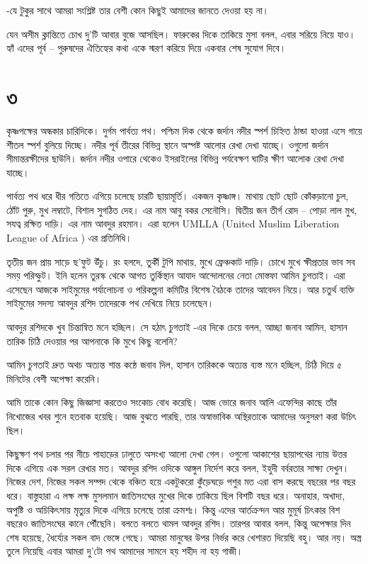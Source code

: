 \documentclass[
]{book}
\begin{document}
-যে টুকুর সাথে আমরা সংশ্লিষ্ট তার বেশী কোন কিছুই আমাদের জানতে দেওয়া হয় না।

যেন অসীম ক্লান্তিতে চোখ দু'টি আবার বুজে আসছিল। ফারুকের দিকে তাকিয়ে মুসা বলল, এবার সরিয়ে নিয়ে যাও। হ্যাঁ এদের পূর্ব -- পুরুষদের ঐতিহ্যের কথা একে স্মরণ করিয়ে দিয়ে একবার শেষ সুযোগ দিবে।

\section*{৩}\label{ota-1-3}

কৃষ্ণপক্ষের অন্ধকার চারিদিকে। দুর্গম পার্বত্য পথ। পশ্চিম দিক থেকে জর্দান নদীর স্পর্শ চিহ্নিত ঠান্ডা হাওয়া এসে গায়ে শীতল স্পর্শ বুলিয়ে দিচ্ছে। নদীর পূর্ব তীরের বিভিন্ন স্থানে অস্পষ্ট আলোর রেখা দেখা যাচ্ছে্। ওগুলো জর্দান সীমান্তরক্ষীদের ছাউনি। জর্দান নদীর ওপারে থেকেও ইসরাইলের বিভিন্ন পর্যবেক্ষণ ঘাটির ক্ষীণ আলোক রেখা দেখা যাচ্ছে।

পার্বত্য পথ ধরে ধীর গতিতে এগিয়ে চলেছে চারটি ছায়ামূর্তি। একজন কৃষ্ণাঙ্গ। মাথায় ছোট ছোট কোঁকড়ানো চুল, ঠোঁট পুরু, মুখ লম্বাটে, বিশাল সুগঠিত দেহ। এর নাম আবু বকর সেনৌসি। দ্বিতীয় জন তীর্গ রোদ -- পোড়া লাল মুখ, সযত্ব রক্ষিত দাড়ি। এর নাম আবদুর রহমান। এরা হলেন UMLLA (United Muslim Liberation League of Africa ) এর প্রতিনিধি।

তৃতীয় জন প্রায় সাড়ে ছ'ফুট উঁচু। রং হলদে, তুর্কী টুপি মাথায়, মুখে ফ্রেঞ্চকাট দাড়ি। চোখে মুখে ক্ষীপ্রতার ভাব সব সময় পরিস্ফুট। ইনি হলেন তুরস্ক থেকে আগত তুর্কিস্থান আযাদ আন্দোলনের নেতা মোস্তফা আমিন চুগতাই। এরা এসেছেন আজকে সাইমুমের পর্যালোচনা ও পরিকল্পনা কমিটির বিশেষ বৈঠকে তাদের আবেদন নিয়ে। আর চতুর্থ ব্যক্তি সাইমুমের সদস্য আবদুর রশিদ তাদেরকে পথ দেখিয়ে নিয়ে চলেছেন।

আবদুর রশিদকে খুব চিন্তান্বিত মনে হচ্ছিল। সে হঠাৎ চুগতাই -এর দিকে চেয়ে বলল, আচ্ছা জনাব আমিন, হাসান তারিক চিঠি দেওয়ার পর আপনাকে কি মুখে কিছু বলেনি?

আমিন চুগতাই দ্রুত অথচ অত্যন্ত শান্ত কন্ঠে জবাব দিল, হাসান তারিককে অত্যন্ত ব্যস্ত মনে হচ্ছিল, চিঠি দিয়ে ৫ মিনিটের বেশী অপেক্ষা করেনি।

আমি তাকে কোন কিছু জিজ্ঞাসা করতেও সংকোচ বোধ করেছি। আজ ভোরে জনাব আলি এফেন্দির কাছে তাঁর নিখোজের খবর শুনে হতবাক হয়েছি। আজ বুঝতে পারছি, তার অস্বাভাবিক অস্থিরতাকে আমাদের অনুসরণ করা উচিৎ ছিল।

কিছুক্ষণ পথ চলার পর নীচে পাহাড়ের ঢালুতে অসংখ্য আলো দেখা গেল। ওগুলো আকাশের ছায়াপথের ন্যায় উত্তর দিকে এগিয়ে এক সরল রেখার মত। আবদুর রশিদ ওদিকে আঙ্গুল নির্দেশ করে বলল, ইহুদী বর্বরতার সাক্ষ্য দেখুন। নিজের দেশ, নিজের সকল সম্পদ থেকে বঞ্চিত হয়ে একটুকরো কুঁড়েঘড়ে পশুর মত এরা বাস করছে বছরের পর বছর ধরে। বাস্তুহারা এ লক্ষ লক্ষ মুসলমান জাতিসংঘের মুখের দিকে তাকিয়ে ছিল বিশটি বছর ধরে। অনাহার, অখাদ্য, অপুষ্টি ও অচিকিৎসায় মৃত্যুর দিকে এগিয়ে চলেছে তারা ক্রমশঃ। কিন্তু এদের আর্তক্রন্দন আর মুমূর্ষ চিৎকার বিশ বছরেও জাতিসংঘের কানে পৌঁছেনি। বলতে বলতে থামল আবদুর রশিদ। তারপর আবার বলল, কিন্তু অপেক্ষার দিন শেষ হয়েছে, ধৈর্য্যের সকল বাদ ভেঙ্গে গেছে। আমরা মানুষের উপর নির্ভর করে খেশারত দিয়েছি বহু। আর নয়। অস্ত্র তুলে নিয়েছি এবার আমরা দু'টো পথ আমাদের সামনে হয় শহীদ না হয় গাজী।
\end{document}
